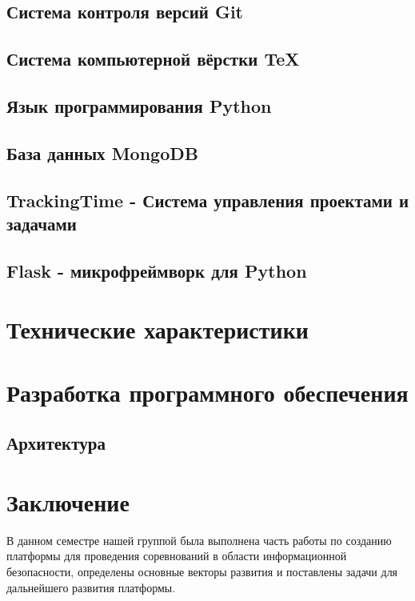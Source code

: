 \subsection{Система контроля версий Git}

\subsection{Система компьютерной вёрстки \TeX}

\subsection{Язык программирования Python}

\subsection{База данных MongoDB}

\subsection{TrackingTime - Система управления проектами и задачами}

\subsection{Flask - микрофреймворк для Python}


\newpage
\section{Технические характеристики}


\section{Разработка программного обеспечения}
\setcounter{figure}{0}
 
\subsection{Архитектура}


\newpage
\section*{Заключение}
В данном семестре нашей группой была выполнена часть работы по созданию платформы для проведения соревнований в области информационной безопасности, определены основные векторы развития и поставлены задачи для дальнейшего развития платформы.
 
